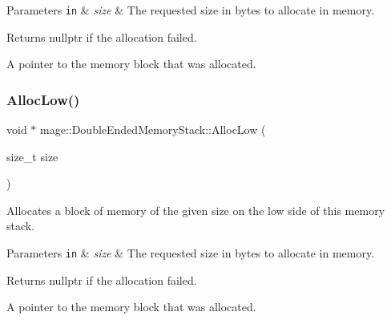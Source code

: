 \begin{DoxyParams}[1]{Parameters}
\mbox{\tt in}  & {\em size} & The requested size in bytes to allocate in memory. \\
\hline
\end{DoxyParams}
\begin{DoxyReturn}{Returns}
{\ttfamily nullptr} if the allocation failed. 

A pointer to the memory block that was allocated. 
\end{DoxyReturn}
\hypertarget{classmage_1_1_double_ended_memory_stack_a4eece9ca8748f77783e8235c6192b260}{}\label{classmage_1_1_double_ended_memory_stack_a4eece9ca8748f77783e8235c6192b260} 
\subsubsection{\texorpdfstring{Alloc\+Low()}{AllocLow()}}
{\footnotesize\ttfamily void $\ast$ mage\+::\+Double\+Ended\+Memory\+Stack\+::\+Alloc\+Low (\begin{DoxyParamCaption}\item[{size\+\_\+t}]{size }\end{DoxyParamCaption})\hspace{0.3cm}{\ttfamily [noexcept]}}

Allocates a block of memory of the given size on the low side of this memory stack.


\begin{DoxyParams}[1]{Parameters}
\mbox{\tt in}  & {\em size} & The requested size in bytes to allocate in memory. \\
\hline
\end{DoxyParams}
\begin{DoxyReturn}{Returns}
{\ttfamily nullptr} if the allocation failed. 

A pointer to the memory block that was allocated. 
\end{DoxyReturn}
\hypertarget{classmage_1_1_double_ended_memory_stack_a6f2d4036e67cca2836293ad421ddfdfd}{}\label{classmage_1_1_double_ended_memory_stack_a6f2d4036e67cca2836293ad421ddfdfd} 
